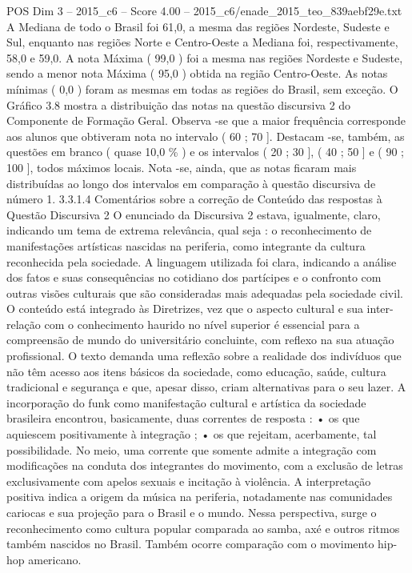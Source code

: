 \begin{textsample}{POS Dim 3 – 2015\_c6 – Score 4.00 – 2015\_c6/enade\_2015\_teo\_839aebf29e.txt}
A Mediana de todo o Brasil foi 61,0, a mesma das regiões Nordeste, Sudeste e Sul, enquanto nas regiões Norte e Centro-Oeste a Mediana foi, respectivamente, 58,0 e 59,0.
A nota Máxima ( 99,0 ) foi a mesma nas regiões Nordeste e Sudeste, sendo a menor nota Máxima ( 95,0 ) obtida na região Centro-Oeste.
As notas mínimas ( 0,0 ) foram as mesmas em todas as regiões do Brasil, sem exceção.
O Gráfico 3.8 mostra a distribuição das notas na questão discursiva 2 do Componente de Formação Geral.
Observa -se que a maior frequência corresponde aos alunos que obtiveram nota no intervalo ( 60 ; 70 ].
Destacam -se, também, as questões em branco ( quase 10,0 \% ) e os intervalos ( 20 ; 30 ], ( 40 ; 50 ] e ( 90 ; 100 ], todos máximos locais.
Nota -se, ainda, que as notas ficaram mais distribuídas ao longo dos intervalos em comparação à questão discursiva de número 1. 3.3.1.4 Comentários sobre a correção de Conteúdo das respostas à Questão Discursiva 2 O enunciado da Discursiva 2 estava, igualmente, claro, indicando um tema de extrema relevância, qual seja : o reconhecimento de manifestações artísticas nascidas na periferia, como integrante da cultura reconhecida pela sociedade.
A linguagem utilizada foi clara, indicando a análise dos fatos e suas consequências no cotidiano dos partícipes e o confronto com outras visões culturais que são consideradas mais adequadas pela sociedade civil.
O conteúdo está integrado às Diretrizes, vez que o aspecto cultural e sua inter-relação com o conhecimento haurido no nível superior é essencial para a compreensão de mundo do universitário concluinte, com reflexo na sua atuação profissional.
O texto demanda uma reflexão sobre a realidade dos indivíduos que não têm acesso aos itens básicos da sociedade, como educação, saúde, cultura tradicional e segurança e que, apesar disso, criam alternativas para o seu lazer.
A incorporação do funk como manifestação cultural e artística da sociedade brasileira encontrou, basicamente, duas correntes de resposta : • os que aquiescem positivamente à integração ; • os que rejeitam, acerbamente, tal possibilidade.
No meio, uma corrente que somente admite a integração com modificações na conduta dos integrantes do movimento, com a exclusão de letras exclusivamente com apelos sexuais e incitação à violência.
A interpretação positiva indica a origem da música na periferia, notadamente nas comunidades cariocas e sua projeção para o Brasil e o mundo.
Nessa perspectiva, surge o reconhecimento como cultura popular comparada ao samba, axé e outros ritmos também nascidos no Brasil.
Também ocorre comparação com o movimento hip-hop americano.

\end{textsample}
